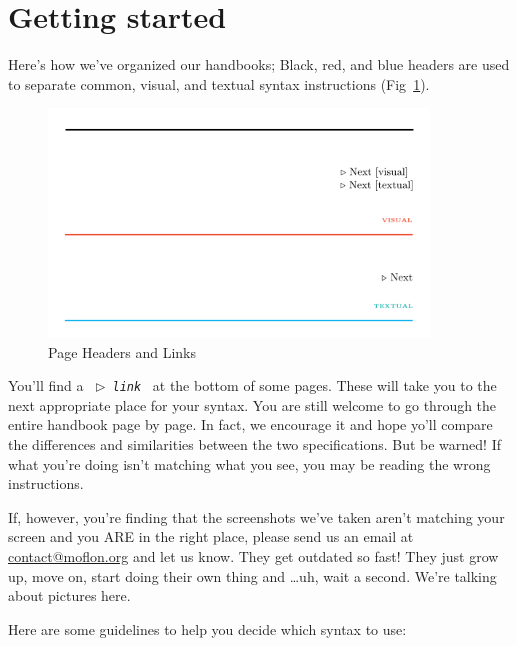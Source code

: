 \section{Getting started}
\genHeader 

Here's how we've organized our handbooks; Black, red, and blue headers are used to separate common, visual, and textual syntax
instructions (Fig~\ref{pageExamples}).

\begin{figure}[htbp] \centering
  \includegraphics[width=0.9\textwidth]{headers}
	\caption{Page Headers and Links} 
	\label{pageExamples} 
\end{figure}

You'll find a \mbox{ $\triangleright$ {\texttt {\emph{link}}} } at the bottom of some pages. These will take you to the next appropriate place for your syntax.
You are still welcome to go through the entire handbook page by page. In fact, we encourage it and hope yo'll compare the differences and similarities
between the two specifications. But be warned! If what you're doing isn't matching what you see, you may be reading the wrong instructions.

If, however, you're finding that the screenshots we've taken aren't matching your screen and you ARE in the right place, please send us an email at
\href{mailto:contact@moflon.org}{contact@moflon.org} and let us know. They get outdated so fast! They just grow up, move on, start doing their own thing and
\ldots uh, wait a second. We're talking about pictures here.

Here are some guidelines to help you decide which syntax to use:

